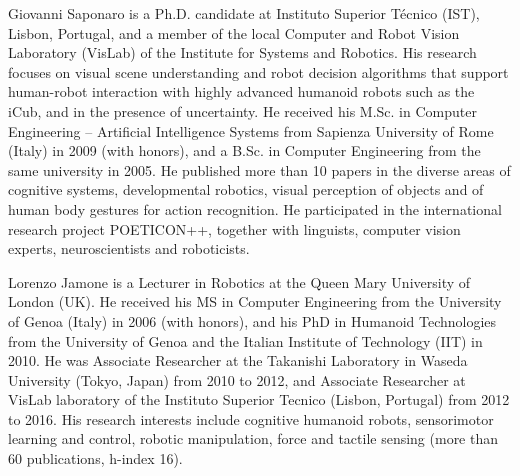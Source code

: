 
\begin{IEEEbiography}{Giovanni Saponaro}
  is a Ph.D. candidate at Instituto Superior Técnico (IST), Lisbon, Portugal, and a member of the local Computer and Robot Vision Laboratory (VisLab) of the Institute for Systems and Robotics. His research focuses on visual scene understanding and robot decision algorithms that support human-robot interaction with highly advanced humanoid robots such as the iCub, and in the presence of uncertainty. He received his M.Sc. in Computer Engineering -- Artificial Intelligence Systems from Sapienza University of Rome (Italy) in 2009 (with honors), and a B.Sc. in Computer Engineering from the same university in 2005. He published more than 10 papers in the diverse areas of cognitive systems, developmental robotics, visual perception of objects and of human body gestures for action recognition. He participated in the international research project POETICON++, together with linguists, computer vision experts, neuroscientists and roboticists.
\end{IEEEbiography}

\begin{IEEEbiography}{Lorenzo Jamone}
  is a Lecturer in Robotics at the Queen Mary University of London (UK). He received his MS in Computer Engineering from the University of Genoa (Italy) in 2006 (with honors), and his PhD in Humanoid Technologies from the University of Genoa and the Italian Institute of Technology (IIT) in 2010. He was Associate Researcher at the Takanishi Laboratory in Waseda University (Tokyo, Japan) from 2010 to 2012, and Associate Researcher at VisLab laboratory of the Instituto Superior Tecnico (Lisbon, Portugal) from 2012 to 2016. His research interests include cognitive humanoid robots, sensorimotor learning and control, robotic manipulation, force and tactile sensing (more than 60 publications, h-index 16).
\end{IEEEbiography}

